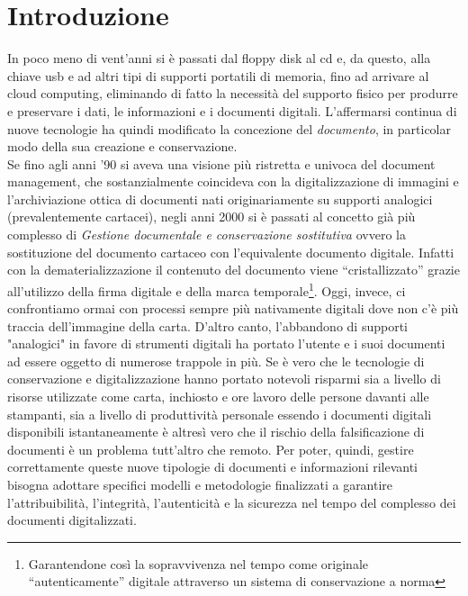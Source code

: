 %
%
\cleardoublepage
%
%
\chapter{Introduzione}
%
%
\label{cap:introduzione}
%
In poco meno di vent'anni si è passati dal floppy disk al cd e, da questo, alla chiave usb e ad altri tipi di supporti portatili di memoria, fino ad arrivare al cloud computing, eliminando di fatto la necessità del supporto fisico per produrre e preservare i dati, le informazioni e i documenti digitali. L'affermarsi continua di nuove tecnologie ha quindi modificato la concezione del \emph{documento}, in particolar modo della sua creazione e conservazione. \\	
Se fino agli anni ’90 si aveva  una visione più ristretta e univoca del document management, che sostanzialmente coincideva con la digitalizzazione di immagini e l’archiviazione ottica di documenti nati originariamente su supporti analogici (prevalentemente cartacei), negli anni 2000 si è passati al concetto già più complesso di \emph{Gestione documentale e conservazione sostitutiva} ovvero la sostituzione del documento cartaceo con l'equivalente documento digitale. Infatti con la \gls{dematerializzazione} il contenuto del documento viene “cristallizzato” grazie all’utilizzo della firma digitale e della marca temporale\footnote{Garantendone così la sopravvivenza nel tempo come originale “autenticamente” digitale attraverso un sistema di conservazione a norma}. Oggi, invece, ci confrontiamo ormai con processi sempre più nativamente digitali dove non c’è più traccia dell’immagine della carta. D'altro canto, l'abbandono di supporti "analogici" in favore di strumenti digitali ha portato l'utente e i suoi documenti ad essere oggetto di numerose trappole in più. Se è vero che le tecnologie di conservazione e digitalizzazione hanno portato notevoli risparmi sia a livello di risorse utilizzate come carta, inchiosto e ore lavoro delle persone davanti alle stampanti, sia a livello di produttività personale essendo i documenti digitali disponibili istantaneamente è altresì vero che il rischio della falsificazione di documenti è un problema tutt'altro che remoto. Per poter, quindi, gestire correttamente queste nuove tipologie di documenti e informazioni rilevanti bisogna adottare specifici modelli e metodologie finalizzati a garantire l’attribuibilità, l’integrità, l’autenticità e la sicurezza nel tempo del complesso dei documenti digitalizzati. \\ 
